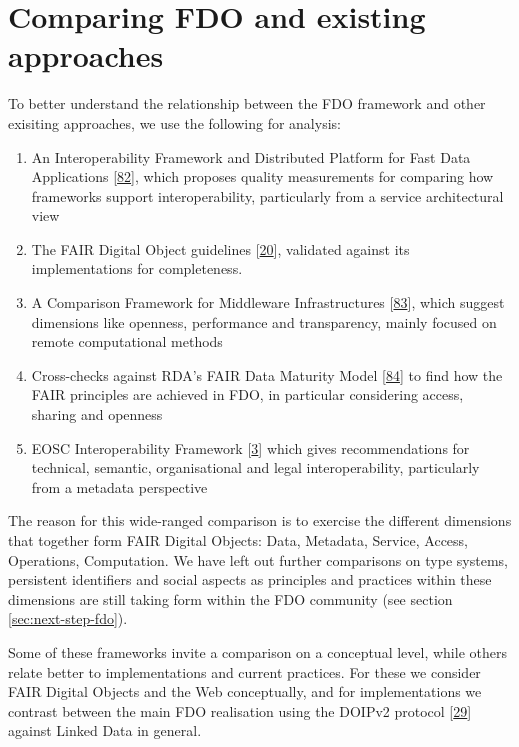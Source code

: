 \hypertarget{sec:comparing}{%
\section{Comparing FDO and existing approaches}\label{sec:comparing}}

To better understand the relationship between the FDO framework and other exisiting approaches, we use the following for analysis:

\begin{enumerate}
\def\labelenumi{\arabic{enumi}.}
\tightlist
\item
  An Interoperability Framework and Distributed Platform for Fast Data Applications {[}\protect\hyperlink{ref-KlCFFFyL}{82}{]}, which proposes quality measurements for comparing how frameworks support interoperability, particularly from a service architectural view
\item
  The FAIR Digital Object guidelines {[}\protect\hyperlink{ref-RwvirqWg}{20}{]}, validated against its implementations for completeness.
\item
  A Comparison Framework for Middleware Infrastructures {[}\protect\hyperlink{ref-hRzcHhPD}{83}{]}, which suggest dimensions like openness, performance and transparency, mainly focused on remote computational methods
\item
  Cross-checks against RDA's FAIR Data Maturity Model {[}\protect\hyperlink{ref-UzQhqk0M}{84}{]} to find how the FAIR principles are achieved in FDO, in particular considering access, sharing and openness
\item
  EOSC Interoperability Framework {[}\protect\hyperlink{ref-aCye3KpE}{3}{]} which gives recommendations for technical, semantic, organisational and legal interoperability, particularly from a metadata perspective
\end{enumerate}

The reason for this wide-ranged comparison is to exercise the different dimensions that together form FAIR Digital Objects: Data, Metadata, Service, Access, Operations, Computation.
We have left out further comparisons on type systems, persistent identifiers and social aspects as principles and practices within these dimensions are still taking form within the FDO community (see section \ref{sec:next-step-fdo}).

Some of these frameworks invite a comparison on a conceptual level, while others relate better to implementations and current practices. For these we consider FAIR Digital Objects and the Web conceptually, and for implementations we contrast between the main FDO realisation using the DOIPv2 protocol {[}\protect\hyperlink{ref-13TcbsZF6}{29}{]} against Linked Data in general.

